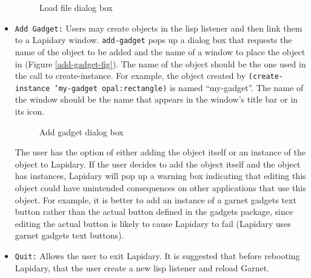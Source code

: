\begin{itemize}
\begin{figure}
\begin{center}
\end{center}
\caption{Load file dialog box}
\end{figure}


\item {}

{\tt Add Gadget:} Users may create objects in the lisp listener and then link
them to a Lapidary window.  {\tt add-gadget} pops up a
dialog box that requests the name of the object to be added
and the name of a window to place the object in (Figure \ref{add-gadget-fig}).
The name of
the object should be the one used in the call to create-instance.
For example, the object created by
{\tt (create-instance 'my-gadget opal:rectangle)} is named ``my-gadget''.
The name of the window should be the name that appears in the
window's title bar or in its icon.

\begin{figure}
\begin{center}
\end{center}
\caption{Add gadget dialog box}
\end{figure}

The user has the option of either adding the object itself or an
instance of the object to Lapidary. If the user decides to add the
object itself and the object has instances, Lapidary will pop up
a warning box indicating that editing this object could have unintended
consequences on other applications that use this object. For example,
it is better to add an instance of a garnet gadgets text button rather
than the actual button defined in the gadgets package, since editing the
actual button is likely to cause Lapidary to fail
(Lapidary uses garnet gadgets text buttons).


\item {}
{\tt Quit:} Allows the user to exit Lapidary. It is suggested that before
rebooting Lapidary, that the user create a new lisp listener and reload
Garnet.

\end{itemize}


